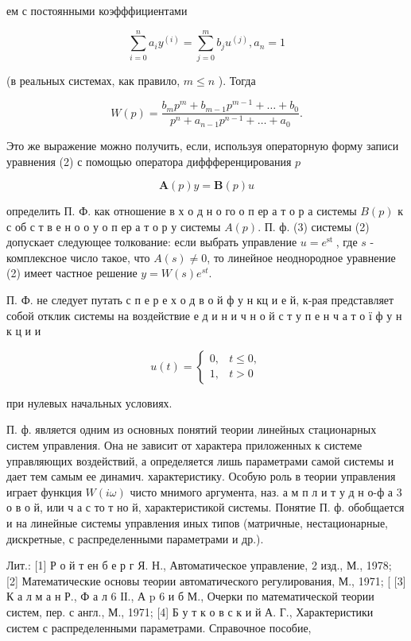 \documentclass[10pt]{article}
\begin{document}
ем с постоянными коэфффициентами

\[
\sum_{i=0}^{n} a_{i} y^{(i)}=\sum_{j=0}^{m} b_{j} u^{(j)}, a_{n}=1
\]

(в реальных системах, как правило, $m \leqslant n$ ). Тогда

\[
W(p)=\frac{b_{m} p^{m}+b_{m-1} p^{m-1}+\ldots+b_{0}}{p^{n}+a_{n-1} p^{n-1}+\ldots+a_{0}} .
\]

Это же выражение можно получить, если, используя операторную форму записи уравнения (2) с помощью оператора диффференцирования $p$

\[
\boldsymbol{A}(p) y=\boldsymbol{B}(p) u
\]

определить П. Ф. как отношение в х о д н о го о п ер а т о р а системы $B(p)$ к с об с т в е н о о у о п ер а т о р у системы $A(p)$. П. ф. (3) системы (2) допускает следующее толкование: если выбрать управление $u=e^{\text {st }}$, где $s$ - комплексное число такое, что $A(s) \neq 0$, то линейное неоднородное уравнение (2) имеет частное решение $y=W(s) e^{s t}$.

П. Ф. не следует путать с п е р е х о д в о й ф у н кц и е й, к-рая представляет собой отклик системы на воздействие е д и н и ч н о й с т у п е н ч а т о ї ф у н к ц и и

\[
u(t)= \begin{cases}0, & t \leqslant 0, \\ 1, & t>0\end{cases}
\]

при нулевых начальных условиях.

П. ф. является одним из основных понятий теории линейных стационарных систем управления. Она не зависит от характера приложенных к системе управляющих воздействий, а определяется лишь параметрами самой системы и дает тем самым ее динамич. характеристику. Особую роль в теории управления играет функция $W(i \omega)$ чисто мнимого аргумента, наз. а м п л и т у д н о-ф а 3 о в о й, или ч а с то т но й, характеристикой системы. Понятие П. ф. обобщается и на линейные системы управления иных типов (матричные, нестационарные, дискретные, с распределенными параметрами и др.).

Лит.: [1] Р о й т ен б е р г Я. Н., Автоматическое управление, 2 изд., М., 1978; [2] Математические основы теории автоматического регулирования, М., 1971; [ [3] К а л м а н Р., Ф а л 6 ІІ., А p 6 и б М., Очерки по математической теории систем, пер. с англ., М., 1971; [4] Б у т к о в с к и й А. Г., Характеристики систем с распределенными параметрами. Справочное пособие,
\end{document}
